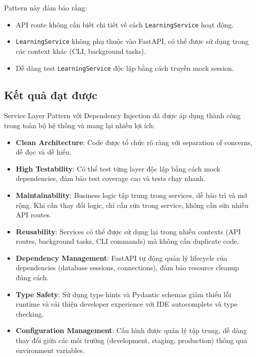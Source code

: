 \documentclass[../DoAn.tex]{subfiles}
\begin{document}
Pattern này đảm bảo rằng:
\begin{itemize}
    \item API route không cần biết chi tiết về cách \texttt{LearningService} hoạt động.
    \item \texttt{LearningService} không phụ thuộc vào FastAPI, có thể được sử dụng trong các context khác (CLI, background tasks).
    \item Dễ dàng test \texttt{LearningService} độc lập bằng cách truyền mock session.
\end{itemize}

\subsection{Kết quả đạt được}
\label{subsection:5.4.3}

Service Layer Pattern với Dependency Injection đã được áp dụng thành công trong toàn bộ hệ thống và mang lại nhiều lợi ích:

\begin{itemize}
    \item \textbf{Clean Architecture}: Code được tổ chức rõ ràng với separation of concerns, dễ đọc và dễ hiểu.
    
    \item \textbf{High Testability}: Có thể test từng layer độc lập bằng cách mock dependencies, đảm bảo test coverage cao và tests chạy nhanh.
    
    \item \textbf{Maintainability}: Business logic tập trung trong services, dễ bảo trì và mở rộng. Khi cần thay đổi logic, chỉ cần sửa trong service, không cần sửa nhiều API routes.
    
    \item \textbf{Reusability}: Services có thể được sử dụng lại trong nhiều contexts (API routes, background tasks, CLI commands) mà không cần duplicate code.
    
    \item \textbf{Dependency Management}: FastAPI tự động quản lý lifecycle của dependencies (database sessions, connections), đảm bảo resource cleanup đúng cách.
    
    \item \textbf{Type Safety}: Sử dụng type hints và Pydantic schemas giảm thiểu lỗi runtime và cải thiện developer experience với IDE autocomplete và type checking.
    
    \item \textbf{Configuration Management}: Cấu hình được quản lý tập trung, dễ dàng thay đổi giữa các môi trường (development, staging, production) thông qua environment variables.
\end{itemize}
\end{document}
